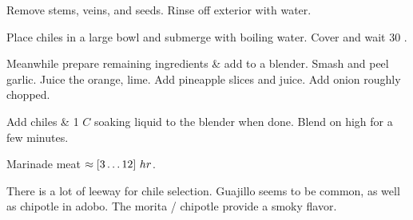 \begin{preparation}
\item Remove stems, veins, and seeds.
    Rinse off exterior with water.

\item Place chiles in a large bowl and submerge with boiling water.
    Cover and wait 30 \minute.

\item Meanwhile prepare remaining ingredients \& add to a blender.
    Smash and peel garlic.
    Juice the orange, lime.
    Add pineapple slices and juice.
    Add onion roughly chopped.

\item Add chiles \& 1 $C$ soaking liquid to the blender when done.
    Blend on high for a few minutes.

\item Marinade meat $\approx[3\ldots12]~\hour$.
\end{preparation}

\begin{variation}
\item There is a lot of leeway for chile selection.
    Guajillo seems to be common, as well as chipotle in adobo.
    The morita / chipotle provide a smoky flavor.
\end{variation}

\recipeend%
